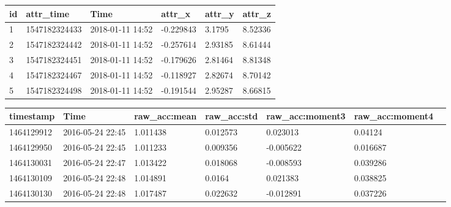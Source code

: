 \documentclass{UoNMCHA}
\numberwithin{equation}{section}
\begin{document}
\begin{table}[]\label{tab:ProjectData}
    \begin{center}
        \begin{tabular}{llllll}
        \hline\hline id & attr\_time & Time & attr\_x   & attr\_y & attr\_z \\ \hline
        1  & 1547182324433 & 2018-01-11 14:52 & -0.229843 & 3.1795  & 8.52336 \\
        2  & 1547182324442 & 2018-01-11 14:52 & -0.257614 & 2.93185 & 8.61444 \\
        3  & 1547182324451 & 2018-01-11 14:52 & -0.179626 & 2.81464 & 8.81348 \\
        4  & 1547182324467 & 2018-01-11 14:52 & -0.118927 & 2.82674 & 8.70142 \\
        5  & 1547182324498 & 2018-01-11 14:52 & -0.191544 & 2.95287 & 8.66815 \\ \hline
        \end{tabular}
    \end{center}
\end{table}


\begin{table}[]\label{tab:ExtraSensoryDataExample}
    \begin{center}
        \begin{tabular}{lllllll}
            \hline\hline timestamp  & Time & raw\_acc:mean & raw\_acc:std & raw\_acc:moment3 & raw\_acc:moment4 \\\hline 
        1464129912 & 2016-05-24 22:45 & 1.011438                       & 0.012573                      & 0.023013                          & 0.04124      \\
        1464129950 & 2016-05-24 22:45 & 1.011233                       & 0.009356                      & -0.005622                         & 0.016687     \\
        1464130031 & 2016-05-24 22:47 & 1.013422                       & 0.018068                      & -0.008593                         & 0.039286     \\
        1464130109 & 2016-05-24 22:48 & 1.014891                       & 0.0164                        & 0.021383                          & 0.038825     \\
        1464130130 & 2016-05-24 22:48 & 1.017487                       & 0.022632                      & -0.012891                         & 0.037226    \\\hline 
        \end{tabular}
    \end{center}
\end{table}
\end{document}
